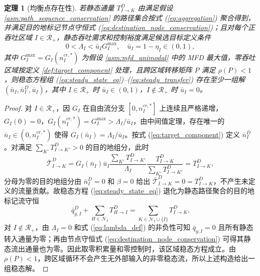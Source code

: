 \documentclass[a4paper,12pt]{article}
\theoremstyle{plain}
\newtheorem{theorem}{定理}[section]
\theoremstyle{definition}
\theoremstyle{remark}
\begin{document}
\begin{theorem}[均衡点存在性]\label{thm:equilibrium_existence}
若静态通量 $T_{I\to K}^D$ 由满足假设 \ref{asm:path_sequence_conservation} 的路径集合按式 (\ref{eq:aggregation}) 聚合得到，并满足目的地标记节点守恒式 (\ref{eq:destination_node_conservation})；且对每个正吞吐区域 $I \in \mathcal{R}_+$，静态吞吐需求和控制裕度满足候选目标定义条件
\begin{equation}\label{eq:margin_feasibility}
    0<\Lambda_I < \bar u_I G_I^{\max},
    \quad \bar u_I=1-\eta_I\in(0,1),
\end{equation}
其中 $G_I^{\max} = G_I(n_I^{cr,*})$ 为假设 \ref{asm:mfd_unimodal} 中的 MFD 最大值，零吞吐区域按定义 \ref{def:target_component} 处理，且跨区域转移矩阵 $P$ 满足 $\rho(P)<1$，则稳态方程组 (\ref{eq:steady_state_eq})--(\ref{eq:steady_transfer}) 存在至少一组解 $(\bar{n}_I, \bar{n}_I^D, \bar{u}_I)$，其中 $I\in\mathcal R_+$ 时 $\bar{u}_I \in (0,1)$，$I\notin\mathcal R_+$ 时 $\bar u_I=0$。
\end{theorem}

\begin{proof}
对 $I\in\mathcal R_+$，因 $G_I$ 在自由流分支 $[0, n_I^{cr,*}]$ 上连续且严格递增，$G_I(0)=0$，$G_I(n_I^{cr,*})=G_I^{\max}>\Lambda_I/\bar u_I$，由中间值定理，存在唯一的 $\bar n_I\in(0,n_I^{cr,*})$ 使得 $G_I(\bar n_I)=\Lambda_I/\bar u_I$。按式 (\ref{eq:target_component}) 定义 $\bar n_I^D$。对满足 $\sum_{K'}T_{I\to K'}^D>0$ 的目的地组分，此时
\begin{equation}
    \bar{\mathcal T}_{I\to K}^D
    =
    G_I(\bar n_I)\bar u_I
    \frac{\sum_{K'}T_{I\to K'}^D}{\Lambda_I}
    \frac{T_{I\to K}^D}{\sum_{K'}T_{I\to K'}^D}
    =
    T_{I\to K}^D ,
\end{equation}
分母为零的目的地组分由 $\bar n_I^D=0$ 和 $\beta=0$ 给出 $\bar{\mathcal T}_{I\to K}^D=0=T_{I\to K}^D$，不产生未定义的流量贡献。故稳态方程 (\ref{eq:steady_state_eq}) 退化为静态路径聚合的目的地标记流守恒
\begin{equation}
    \bar q_{g,I}^D+\sum_{H\in\mathcal N_I}T_{H\to I}^D
    =
    \sum_{K\in\mathcal N_I\cup\{I\}}T_{I\to K}^D .
\end{equation}
对 $I\notin\mathcal R_+$，由 $\Lambda_I=0$ 和式 (\ref{eq:lambda_def}) 的非负性可知 $\bar q_{g,I}=0$ 且所有静态转入通量为零；再由节点守恒式 (\ref{eq:destination_node_conservation}) 可得其静态流出通量也为零。因此取零积累量和零控制时，该区域稳态方程成立。由 $\rho(P)<1$，跨区域循环不会产生无外部输入的非零稳态流，所以上述构造给出一组稳态解。
\end{proof}
\end{document}
